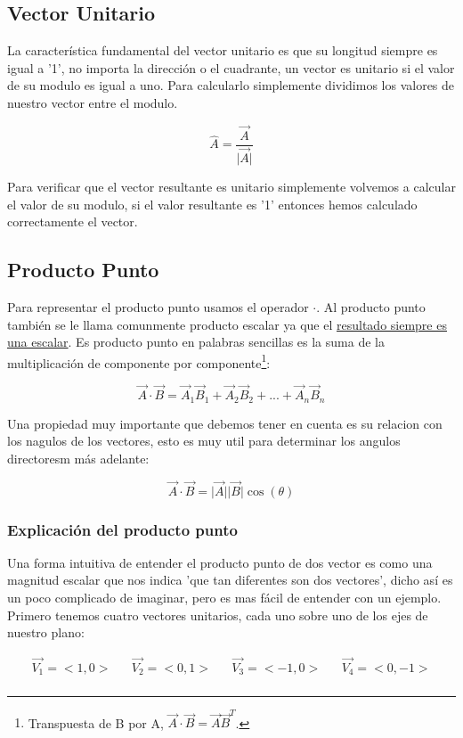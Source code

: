 \documentclass{article}
\begin{document}
\subsection{Vector Unitario}
\label{sec:org9a96770}
La característica fundamental del vector unitario es que su longitud siempre es igual a '1', no importa la dirección o el cuadrante, un vector es unitario si el valor de su modulo es igual a uno. Para calcularlo simplemente dividimos los valores de nuestro vector entre el modulo.

\[ 
\hat{A} = \frac{\vec{A}}{\vert\vec{A}\vert} 
\]

Para verificar que el vector resultante es unitario simplemente volvemos a calcular el valor de su modulo, si el valor resultante es '1' entonces hemos calculado correctamente el vector.

\subsection{Producto Punto}
\label{sec:org5a3fcdf}
Para representar el producto punto usamos el operador \(\cdot\). Al producto punto también se le llama comunmente producto escalar ya que el \uline{resultado siempre es una escalar}. Es producto punto en palabras sencillas es la suma de la multiplicación de componente por componente\footnote{Transpuesta de B por A, \(\vec{A} \cdot \vec{B} = \vec{A}\vec{B}^T\).}:

\[
\vec{A} \cdot \vec{B} = \vec{A}_1 \vec{B}_1 + \vec{A}_2 \vec{B}_2 + ... + \vec{A}_n \vec{B}_n
\]

Una propiedad muy importante que debemos tener en cuenta es su relacion con los nagulos de los vectores, esto es muy util para determinar los angulos directoresm más adelante:

\[
 \vec{A}\cdot\vec{B} = \vert\vec{A}\vert\vert\vec{B}\vert \cos(\theta)
\]

\subsubsection*{Explicación del producto punto}
\label{sec:org4c4077e}
Una forma intuitiva de entender el producto punto de dos vector es como una magnitud escalar que nos indica 'que tan diferentes son dos vectores', dicho así es un poco complicado de imaginar, pero es mas fácil de entender con un ejemplo. Primero tenemos cuatro vectores unitarios, cada uno sobre uno de los ejes de nuestro plano:

\[\begin{aligned}
  \vec{V_1} = <1,0>  && 
  \vec{V_2} = <0,1>  &&
  \vec{V_3} = <-1,0> &&
  \vec{V_4} = <0,-1> \\
\end{aligned}\] 
\end{document}
